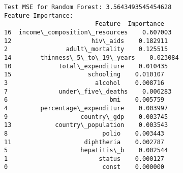 \documentclass[11pt]{article}
\begin{document}
    \begin{Verbatim}[commandchars=\\\{\}]
Test MSE for Random Forest: 3.5643493545454628
Feature Importance:
                         Feature  Importance
16  income\_composition\_resources    0.607003
12                      hiv\_aids    0.182911
2                adult\_mortality    0.125515
14        thinness\_5\_to\_19\_years    0.023084
10             total\_expenditure    0.010435
15                     schooling    0.010107
3                        alcohol    0.008716
7              under\_five\_deaths    0.006283
6                            bmi    0.005759
4         percentage\_expenditure    0.003997
9                    country\_gdp    0.003745
13            country\_population    0.003543
8                          polio    0.003443
11                    diphtheria    0.002787
5                    hepatitis\_b    0.002544
1                         status    0.000127
0                          const    0.000000
    \end{Verbatim}
\end{document}
